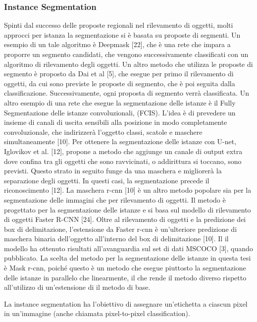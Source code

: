 \subsubsection{Instance Segmentation}

Spinti dal successo delle proposte regionali nel rilevamento di oggetti, molti approcci per istanza la segmentazione si è basata su proposte di segmenti. Un esempio di un tale algoritmo è Deepmask [22], che è una rete che impara a proporre un segmento candidati, che vengono successivamente classificati con un algoritmo di rilevamento degli oggetti. Un altro metodo che utilizza le proposte di segmento è proposto da Dai et al [5], che esegue per primo il rilevamento di oggetti, da cui sono previste le proposte di segmento, che è poi seguita dalla classificazione. Successivamente, ogni proposta di segmento verrà classificata. Un altro esempio di una rete che esegue la segmentazione delle istanze è il Fully Segmentazione delle istanze convoluzionali, (FCIS). L'idea è di prevedere un insieme di canali di uscita sensibili alla posizione in modo completamente convoluzionale, che indirizzerà l'oggetto classi, scatole e maschere simultaneamente [10]. Per ottenere la segmentazione delle istanze con U-net, Iglovikov et al. [12], propone a metodo che aggiunge un canale di output extra dove confina tra gli oggetti che sono ravvicinati, o addirittura si toccano, sono previsti. Questo strato in seguito funge da una maschera e migliorerà la separazione degli oggetti. In questi casi, la segmentazione precede il riconoscimento [12]. La maschera r-cnn [10] è un altro metodo popolare sia per la segmentazione delle immagini che per rilevamento di oggetti. Il metodo è progettato per la segmentazione delle istanze e si basa sul modello di rilevamento di oggetti Faster R-CNN [24]. Oltre al rilevamento di oggetti e la predizione dei box di delimitazione, l'estensione da Faster r-cnn è un'ulteriore predizione di maschera binaria dell'oggetto all'interno del box di delimitazione [10]. Il il modello ha ottenuto risultati all'avanguardia sul set di dati MSCOCO [3], quando pubblicato. La scelta del metodo per la segmentazione delle istanze in questa tesi è Mask r-cnn, poiché questo è un metodo che esegue piuttosto la segmentazione delle istanze in parallelo che linearmente, il che rende il metodo diverso rispetto all'utilizzo di un'estensione di il metodo di base.








La instance segmentation ha l'obiettivo di assegnare un'etichetta a ciascun pixel in un'immagine (anche chiamata pixel-to-pixel classification). 

